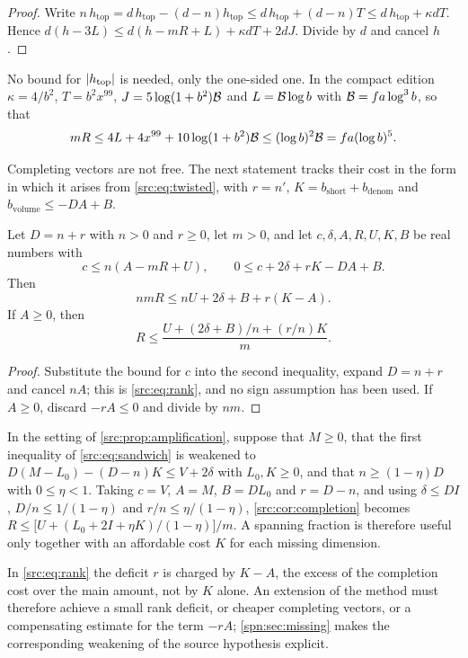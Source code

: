 \begin{proof}
Write $n\,h_{\mathrm{top}}=d\,h_{\mathrm{top}}-(d-n)h_{\mathrm{top}}\le d\,h_{\mathrm{top}}+(d-n)T
\le d\,h_{\mathrm{top}}+\kappa dT$. Hence
$d(h-3L)\le d(h-mR+L)+\kappa dT+2dJ$. Divide by $d$ and cancel $h$.
\end{proof}

No bound for $\lvert h_{\mathrm{top}}\rvert$ is needed, only the one-sided one. In the compact
edition $\kappa=4/b^2$, $T=b^2x^{99}$, $J=5\log(1+b^2)\mathcal{B}$ and $L=\mathcal{B}\log b$ with
$\mathcal{B}=fa\log^3b$, so that
\[
mR\le4L+4x^{99}+10\log(1+b^2)\mathcal{B}\le(\log b)^2\mathcal{B}=fa(\log b)^5 .
\]

Completing vectors are not free. The next statement tracks their cost in the form in which it
arises from \eqref{src:eq:twisted}, with $r=n'$, $K=b_{\mathrm{short}}+b_{\mathrm{denom}}$ and
$b_{\mathrm{volume}}\le-DA+B$.

\begin{proposition}\label{src:prop:rank}
Let $D=n+r$ with $n>0$ and $r\ge0$, let $m>0$, and let $c,\delta,A,R,U,K,B$ be real numbers
with
\[
c\le n(A-mR+U),\qquad 0\le c+2\delta+rK-DA+B .
\]
Then
\begin{equation}\label{src:eq:rank}
nmR\le nU+2\delta+B+r(K-A) .
\end{equation}
If $A\ge0$, then
\begin{equation}\label{src:cor:completion}
R\le\frac{U+(2\delta+B)/n+(r/n)K}{m} .
\end{equation}
\end{proposition}

\begin{proof}
Substitute the bound for $c$ into the second inequality, expand $D=n+r$ and cancel $nA$; this
is \eqref{src:eq:rank}, and no sign assumption has been used. If $A\ge0$, discard $-rA\le0$ and
divide by $nm$.
\end{proof}

In the setting of \cref{src:prop:amplification}, suppose that $M\ge0$, that the first
inequality of \eqref{src:eq:sandwich} is weakened to $D(M-L_0)-(D-n)K\le V+2\delta$ with
$L_0,K\ge0$, and that $n\ge(1-\eta)D$ with $0\le\eta<1$. Taking $c=V$, $A=M$, $B=DL_0$ and
$r=D-n$, and using $\delta\le DI$, $D/n\le1/(1-\eta)$ and $r/n\le\eta/(1-\eta)$,
\eqref{src:cor:completion} becomes
$R\le\bigl[U+(L_0+2I+\eta K)/(1-\eta)\bigr]/m$. A spanning fraction is therefore useful only
together with an affordable cost $K$ for each missing dimension.

In \eqref{src:eq:rank} the deficit $r$ is charged by $K-A$, the excess of the completion cost
over the main amount, not by $K$ alone. An extension of the method must therefore achieve a
small rank deficit, or cheaper completing vectors, or a compensating estimate for the term
$-rA$; \cref{spn:sec:missing} makes the corresponding weakening of the source hypothesis
explicit.

